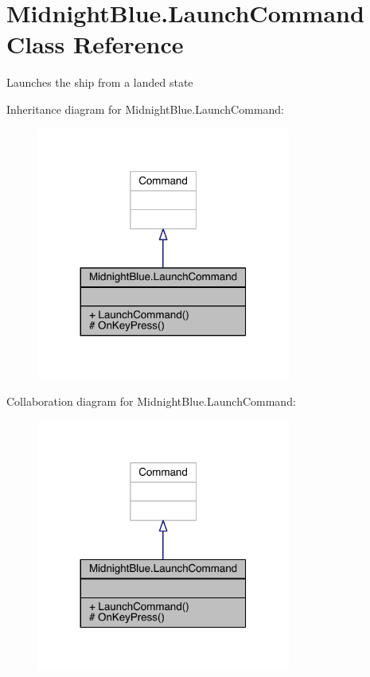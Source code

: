 \hypertarget{class_midnight_blue_1_1_launch_command}{}\section{Midnight\+Blue.\+Launch\+Command Class Reference}
\label{class_midnight_blue_1_1_launch_command}


Launches the ship from a landed state  




Inheritance diagram for Midnight\+Blue.\+Launch\+Command\+:
\nopagebreak
\begin{figure}[H]
\begin{center}
\leavevmode
\includegraphics[width=236pt]{class_midnight_blue_1_1_launch_command__inherit__graph}
\end{center}
\end{figure}


Collaboration diagram for Midnight\+Blue.\+Launch\+Command\+:
\nopagebreak
\begin{figure}[H]
\begin{center}
\leavevmode
\includegraphics[width=236pt]{class_midnight_blue_1_1_launch_command__coll__graph}
\end{center}
\end{figure}
